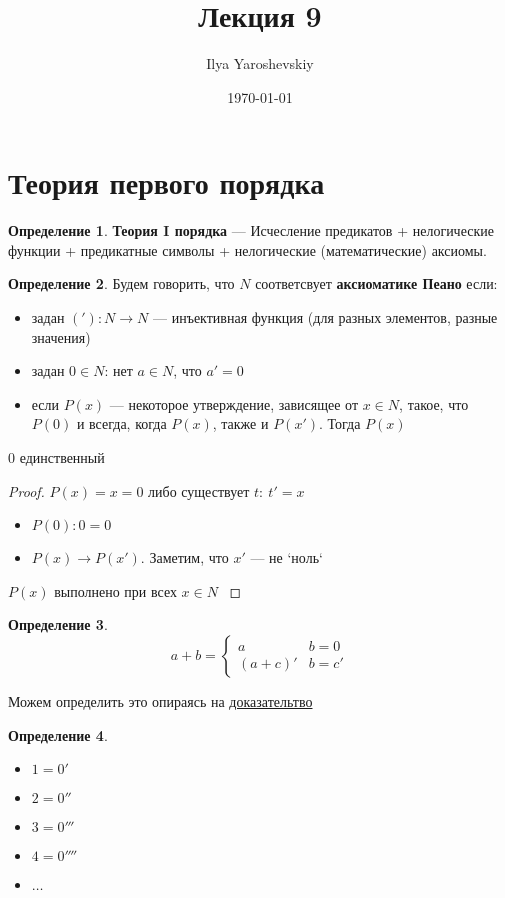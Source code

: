 \documentclass[english]{article}
\author{Ilya Yaroshevskiy}
\date{\today}
\title{Лекция 9}
\newcounter{propertycnt}
\newcommand{\beginproperty}{\setcounter{propertycnt}{1}}
\theoremstyle{plain}
\newenvironment{property}{
  \renewcommand\thepropertyinner{\arabic{propertycnt}}
  \propertyinner
}{\endpropertyinner\stepcounter{propertycnt}}
\theoremstyle{remark}
\theoremstyle{definition}
\newtheorem*{definition}{Определение}
\begin{document}
\maketitle
\tableofcontents


\section{Теория первого порядка}
\label{sec:orgcf6f307}
\begin{definition}
\textbf{Теория I порядка} --- Исчесление предикатов + нелогические функции + предикатные символы + нелогические (математические) аксиомы.
\label{orgf71ef0e}
\end{definition}
\begin{definition}
Будем говорить, что \(N\) соответсвует \textbf{аксиоматике Пеано} если:
\begin{itemize}
\item задан \(('): N \to N\) --- инъективная функция (для разных элементов, разные значения)
\item задан \(0 \in N\): нет \(a \in N\), что \(a' = 0\)
\item если \(P(x)\) --- некоторое утверждение, зависящее от \(x \in N\), такое, что \(P(0)\) и всегда, когда \(P(x)\), также и \(P(x')\). Тогда \(P(x)\)
\end{itemize}
\label{org7d6616e}
\end{definition}
\beginproperty
\begin{property}
\(0\) единственный
\label{org7a375b3}
\end{property}
\begin{proof}
\(P(x)=x = 0\) либо существует \(t:\ t' = x\)
\begin{itemize}
\item \(P(0): 0 = 0\)
\item \(P(x) \to P(x')\). Заметим, что \(x'\) --- не `ноль`
\end{itemize}
\(P(x)\) выполнено при всех \(x \in N\)
\label{org86e7929}
\end{proof}
\begin{definition}
\[ a + b = \begin{cases}
a & b = 0 \\
(a + c)' & b = c'
\end{cases}\]
\label{org8fe3c59}
\end{definition}
Можем определить это опираясь на \hyperref[org86e7929]{доказательтво}
\begin{definition}
\begin{itemize}
\item \(1 = 0'\)
\item \(2 = 0''\)
\item \(3 = 0'''\)
\item \(4 = 0''''\)
\item \(\dots\)
\end{itemize}
\end{definition}
\end{document}
